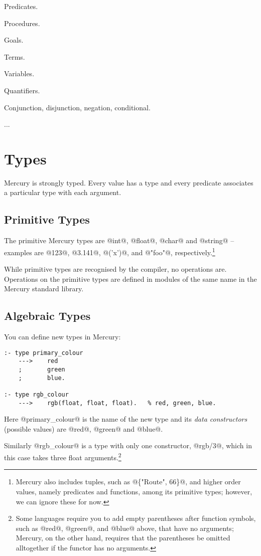 \documentclass[a4paper,11pt,notitlepage,onecolumn]{article}
\begin{document}
Predicates.

Procedures.

Goals.

Terms.

Variables.

Quantifiers.

Conjunction, disjunction, negation, conditional.

...



\section{Types}

Mercury is strongly typed.  Every value has a type and every
predicate associates a particular type with each argument.

\subsection{Primitive Types}

The primitive Mercury types are @int@, @float@, @char@ and @string@ --
examples are @123@, @3.141@, @('x')@, and @"foo"@,
respectively.\footnote{Mercury also includes tuples, such as @\{"Route",
66\}@, and higher order values, namely predicates and functions, among
its primitive types; however, we can ignore these for now.}

While primitive types are recognised by the compiler, no
operations are.  Operations on the primitive types are defined in
modules of the same name in the Mercury standard library.

\subsection{Algebraic Types}

You can define new types in Mercury:
\begin{verbatim}
:- type primary_colour
    --->    red
    ;       green
    ;       blue.

:- type rgb_colour
    --->    rgb(float, float, float).   % red, green, blue.
\end{verbatim}

Here @primary_colour@ is the name of the new type and its
\emph{data constructors} (possible values) are @red@, @green@ and @blue@.

Similarly @rgb_colour@ is a type with only one constructor,
@rgb/3@, which in this case takes three float arguments.\footnote{Some languages require you to add empty parentheses
after function symbols, such as @red@, @green@, and @blue@ above,
that have no arguments; Mercury, on the other hand, requires
that the parentheses be omitted alltogether if the functor has
no arguments.}
\end{document}
